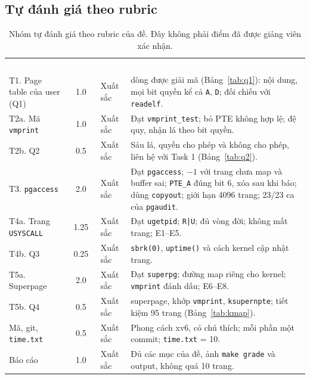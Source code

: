 \documentclass[10pt,a4paper]{article}
\newcommand{\cc}[1]{\texttt{#1}}
\newcommand{\thd}[1]{\textcolor{white}{\textbf{#1}}}
\newcommand{\headrow}{\rowcolor{hcmus}}
\begin{document}
\subsection{Tự đánh giá theo rubric}
\begin{table}[H]
\centering\small
\begin{tabularx}{\linewidth}{@{}l c l >{\raggedright\arraybackslash}X@{}}
\headrow \thd{Hạng mục} & \thd{Điểm} & \thd{Mức} & \thd{Minh chứng} \\
T1. Page table của user (Q1) & 1.0 & Xuất sắc & 20 dòng được giải mã (Bảng~\ref{tab:q1}): nội dung, mọi bit quyền kể cả \cc{A}, \cc{D}; đối chiếu với \cc{readelf}. \\
\rowcolor{rowalt}
T2a. Mã \cc{vmprint} & 1.0 & Xuất sắc & Đạt \cc{vmprint\_test}; bỏ PTE không hợp lệ; đệ quy, nhận lá theo bit quyền. \\
T2b. Q2 & 0.5 & Xuất sắc & Sáu lá, quyền cho phép và không cho phép, liên hệ với Task 1 (Bảng~\ref{tab:q2}). \\
\rowcolor{rowalt}
T3. \cc{pgaccess} & 2.0 & Xuất sắc & Đạt \cc{pgaccess}; $-1$ với trang chưa map và buffer sai; \cc{PTE\_A} đúng bit 6, xóa sau khi báo; dùng \cc{copyout}; giới hạn 4096 trang; 23/23 ca của \cc{pgaudit}. \\
T4a. Trang \cc{USYSCALL} & 1.25 & Xuất sắc & Đạt \cc{ugetpid}; \cc{R|U}; đủ vòng đời; không mất trang; E1--E5. \\
\rowcolor{rowalt}
T4b. Q3 & 0.25 & Xuất sắc & \cc{sbrk(0)}, \cc{uptime()} và cách kernel cập nhật trang. \\
T5a. Superpage & 2.0 & Xuất sắc & Đạt \cc{superpg}; đường map riêng cho kernel; \cc{vmprint} đánh dấu; E6--E8. \\
\rowcolor{rowalt}
T5b. Q4 & 0.5 & Xuất sắc & 95 superpage, khớp \cc{vmprint}, \cc{ksupernpte}; tiết kiệm 95 trang (Bảng~\ref{tab:kmap}). \\
Mã, git, \cc{time.txt} & 0.5 & Xuất sắc & Phong cách xv6, có chú thích; mỗi phần một commit; \cc{time.txt} = 10. \\
\rowcolor{rowalt}
Báo cáo & 1.0 & Xuất sắc & Đủ các mục của đề, ảnh \cc{make grade} và output, không quá 10 trang. \\
\bottomrule
\end{tabularx}
\caption{Nhóm tự đánh giá theo rubric của đề. Đây không phải điểm đã được giảng viên xác nhận.}
\end{table}

\end{document}
